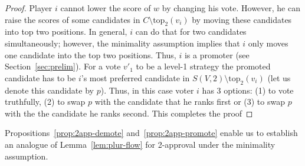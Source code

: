 \documentclass[11pt]{article}
\newcommand{\tp}{\mathrm{top}}
\begin{document}
\begin{proof}
Player $i$ cannot lower the score of $w$ by changing his vote. However, he can raise the scores
of some candidates in $C\setminus\tp_2(v_i)$ by moving these candidates into top two positions.
In general, $i$ can do that for two candidates simultaneously; however, the minimality
assumption implies that $i$ only moves one candidate into the top two positions. 
Thus, $i$ is a promoter (see Section~\ref{sec:prelim}).
For a vote $v'_1$ to be a level-1 strategy 
the promoted candidate has to be $i$'s most preferred candidate in $S(V,2)\setminus \tp_2(v_i)$ 
(let us denote this candidate by $p$). 
Thus, in this case voter $i$ has 3 options:
(1) to vote truthfully, 
(2) to swap $p$ with the candidate that he ranks first or 
(3) to swap $p$ with the the candidate he ranks second.
This completes the proof
\end{proof}

Propositions~\ref{prop:2app-demote} and~\ref{prop:2app-promote}
enable us to establish an analogue of Lemma~\ref{lem:plur-flow}
for 2-approval under the minimality assumption.
\end{document}
